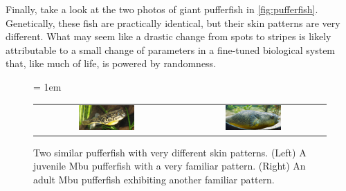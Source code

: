 Finally, take a look at the two photos of giant pufferfish in \autoref{fig:pufferfish}. Genetically, these fish are practically identical, but their skin patterns are very different. What may seem like a drastic change from spots to stripes is likely attributable to a small change of parameters in a fine-tuned biological system that, like much of life, is powered by randomness.\\

\begin{figure}[h]
\centering
\mySfFamily
\tabcolsep = 1em
\begin{tabular}{c c}
\includegraphics[width = 0.4\textwidth]{../images/Juvenile_Mbu_pufferfish.jpg} & \includegraphics[width = 0.4\textwidth]{../images/Giant_Puffer_fish_skin_pattern.jpg}
\end{tabular}
\caption{Two similar pufferfish with very different skin patterns. (Left) A juvenile Mbu pufferfish with a very familiar pattern. (Right) An adult Mbu pufferfish exhibiting another familiar pattern.}
\label{fig:pufferfish}
\end{figure}
